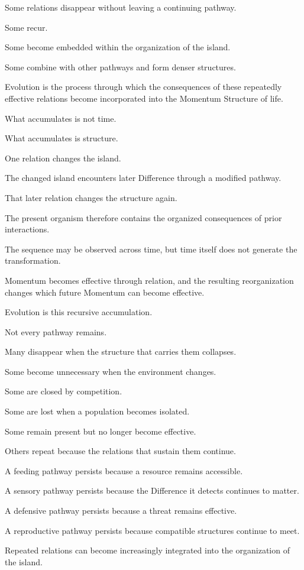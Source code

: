 Some relations disappear without leaving a continuing pathway.

Some recur.

Some become embedded within the organization of the island.

Some combine with other pathways and form denser structures.

Evolution is the process through which the consequences of these repeatedly effective relations become incorporated into the Momentum Structure of life.

What accumulates is not time.

What accumulates is structure.

One relation changes the island.

The changed island encounters later Difference through a modified pathway.

That later relation changes the structure again.

The present organism therefore contains the organized consequences of prior interactions.

The sequence may be observed across time, but time itself does not generate the transformation.

Momentum becomes effective through relation, and the resulting reorganization changes which future Momentum can become effective.

Evolution is this recursive accumulation.

Not every pathway remains.

Many disappear when the structure that carries them collapses.

Some become unnecessary when the environment changes.

Some are closed by competition.

Some are lost when a population becomes isolated.

Some remain present but no longer become effective.

Others repeat because the relations that sustain them continue.

A feeding pathway persists because a resource remains accessible.

A sensory pathway persists because the Difference it detects continues to matter.

A defensive pathway persists because a threat remains effective.

A reproductive pathway persists because compatible structures continue to meet.

Repeated relations can become increasingly integrated into the organization of the island.

